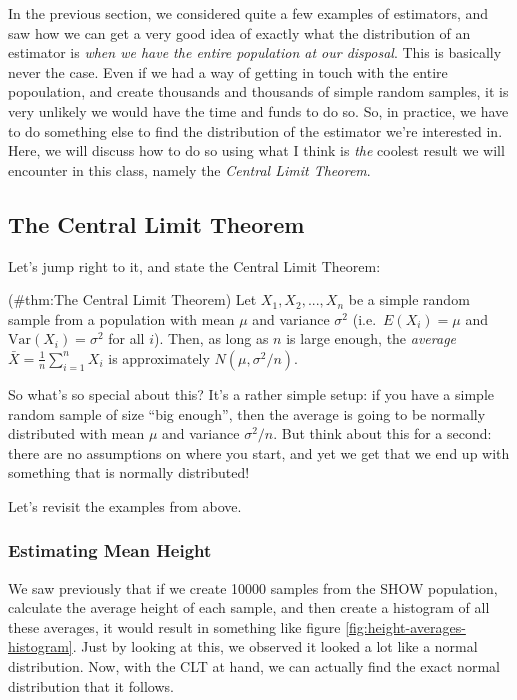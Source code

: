 \documentclass[]{book}
\theoremstyle{definition}
\theoremstyle{definition}
\theoremstyle{definition}
\theoremstyle{remark}
\let\BeginKnitrBlock\begin \let\EndKnitrBlock\end
\begin{document}
In the previous section, we considered quite a few examples of estimators, and saw how we can get a very good idea of exactly what the distribution of an estimator is \emph{when we have the entire population at our disposal}. This is basically never the case. Even if we had a way of getting in touch with the entire popoulation, and create thousands and thousands of simple random samples, it is very unlikely we would have the time and funds to do so. So, in practice, we have to do something else to find the distribution of the estimator we're interested in. Here, we will discuss how to do so using what I think is \emph{the} coolest result we will encounter in this class, namely the \emph{Central Limit Theorem}.

\hypertarget{CLT}{%
\subsection{The Central Limit Theorem}\label{CLT}}

Let's jump right to it, and state the Central Limit Theorem:

\BeginKnitrBlock{theorem}
\protect\hypertarget{thm:Theux20Centralux20Limitux20Theorem}{}{(\#thm:The Central Limit Theorem) }Let \(X_1, X_2, ..., X_n\) be a simple random sample from a population with mean \(\mu\) and variance \(\sigma^2\) (i.e.~\(E(X_i) = \mu\) and \(\text{Var}(X_i) = \sigma^2\) for all \(i\)). Then, as long as \(n\) is large enough, the \emph{average} \(\bar{X} = \frac{1}{n} \sum_{i=1}^n X_i\) is approximately \(N(\mu, \sigma^2 / n)\).
\EndKnitrBlock{theorem}

So what's so special about this? It's a rather simple setup: if you have a simple random sample of size ``big enough'', then the average is going to be normally distributed with mean \(\mu\) and variance \(\sigma^2/n\). But think about this for a second: there are no assumptions on where you start, and yet we get that we end up with something that is normally distributed!

Let's revisit the examples from above.

\hypertarget{estimating-mean-height-1}{%
\subsubsection*{Estimating Mean Height}\label{estimating-mean-height-1}}

We saw previously that if we create 10000 samples from the SHOW population, calculate the average height of each sample, and then create a histogram of all these averages, it would result in something like figure \ref{fig:height-averages-histogram}. Just by looking at this, we observed it looked a lot like a normal distribution. Now, with the CLT at hand, we can actually find the exact normal distribution that it follows.
\end{document}

